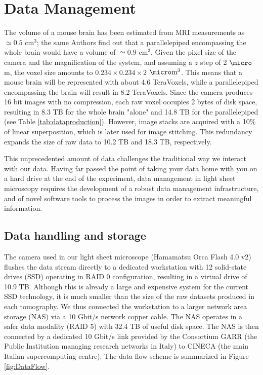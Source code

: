 \documentclass[12pt]{spieman}  %
\begin{document}
\section{Data Management}

The volume of a mouse brain has been estimated from MRI measurements \cite{Kovacevic2005} as $\simeq 0.5$ $\text{cm}^3$; the same Authors find out that a parallelepiped encompassing the whole brain would have a volume of $\simeq 0.9$ $\text{cm}^3$. Given the pixel size of the camera and the magnification of the system, and assuming a $z$ step of 2 $\micro$m, the voxel size amounts to $0.234\times0.234\times2$ $\micro\text{m}^3$. This means that a mouse brain will be represented with about 4.6 TeraVoxels, while a parallelepiped encompassing the brain will result in 8.2 TeraVoxels. Since the camera produces 16 bit images with no compression, each raw voxel occupies 2 bytes of disk space, resulting in 8.3 TB for the whole brain "alone" and 14.8 TB for the parallelepiped (see Table \ref{tab:dataproduction}). However, image stacks are acquired with a 10\% of linear superposition, which is later used for image stitching. This redundancy expands the size of raw data to 10.2 TB and 18.3 TB, respectively.

This unprecedented amount of data challenges the traditional way we interact with our data. Having far passed the point of taking your data home with you on a hard drive at the end of the experiment, data management in light sheet microscopy requires the development of a robust data management infrastructure, and of novel software tools to process the images in order to extract meaningful information.

\subsection{Data handling and storage}

The camera used in our light sheet microscope (Hamamatsu Orca Flash 4.0 v2) flushes the data stream directly to a dedicated workstation with 12 solid-state drives (SSD) operating in RAID 0 configuration, resulting in a virtual drive of 10.9 TB. Although this is already a large and expensive system for the current SSD technology, it is much smaller than the size of the raw datasets produced in each tomography. We thus connected the workstation to a larger network area storage (NAS) via a 10 Gbit/s network copper cable. The NAS operates in a safer data modality (RAID 5) with 32.4 TB of useful disk space. The NAS is then connected by a dedicated 10 Gbit/s link provided by the Consortium GARR (the Public Institution managing research networks in Italy) to CINECA (the main Italian supercomputing centre). The data flow scheme is summarized in Figure \ref{fig:DataFlow}.
\end{document}
